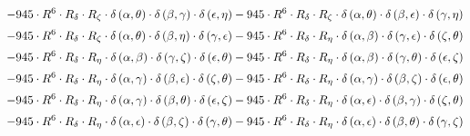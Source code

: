 \begin{subequations}
\begin{gather}
 \\[0.2em] \notag 		 - 945 \cdot R^{6} \cdot R_{\delta{}} \cdot R_{\zeta{}} \cdot \delta{}\left(\alpha{}, \theta{}\right) \cdot \delta{}\left(\beta{}, \gamma{}\right) \cdot \delta{}\left(\epsilon{}, \eta{}\right)- 945 \cdot R^{6} \cdot R_{\delta{}} \cdot R_{\zeta{}} \cdot \delta{}\left(\alpha{}, \theta{}\right) \cdot \delta{}\left(\beta{}, \epsilon{}\right) \cdot \delta{}\left(\gamma{}, \eta{}\right) 
 \\[0.2em] \notag 		 - 945 \cdot R^{6} \cdot R_{\delta{}} \cdot R_{\zeta{}} \cdot \delta{}\left(\alpha{}, \theta{}\right) \cdot \delta{}\left(\beta{}, \eta{}\right) \cdot \delta{}\left(\gamma{}, \epsilon{}\right)- 945 \cdot R^{6} \cdot R_{\delta{}} \cdot R_{\eta{}} \cdot \delta{}\left(\alpha{}, \beta{}\right) \cdot \delta{}\left(\gamma{}, \epsilon{}\right) \cdot \delta{}\left(\zeta{}, \theta{}\right) 
 \\[0.2em] \notag 		 - 945 \cdot R^{6} \cdot R_{\delta{}} \cdot R_{\eta{}} \cdot \delta{}\left(\alpha{}, \beta{}\right) \cdot \delta{}\left(\gamma{}, \zeta{}\right) \cdot \delta{}\left(\epsilon{}, \theta{}\right)- 945 \cdot R^{6} \cdot R_{\delta{}} \cdot R_{\eta{}} \cdot \delta{}\left(\alpha{}, \beta{}\right) \cdot \delta{}\left(\gamma{}, \theta{}\right) \cdot \delta{}\left(\epsilon{}, \zeta{}\right) 
 \\[0.2em] \notag 		 - 945 \cdot R^{6} \cdot R_{\delta{}} \cdot R_{\eta{}} \cdot \delta{}\left(\alpha{}, \gamma{}\right) \cdot \delta{}\left(\beta{}, \epsilon{}\right) \cdot \delta{}\left(\zeta{}, \theta{}\right)- 945 \cdot R^{6} \cdot R_{\delta{}} \cdot R_{\eta{}} \cdot \delta{}\left(\alpha{}, \gamma{}\right) \cdot \delta{}\left(\beta{}, \zeta{}\right) \cdot \delta{}\left(\epsilon{}, \theta{}\right) 
 \\[0.2em] \notag 		 - 945 \cdot R^{6} \cdot R_{\delta{}} \cdot R_{\eta{}} \cdot \delta{}\left(\alpha{}, \gamma{}\right) \cdot \delta{}\left(\beta{}, \theta{}\right) \cdot \delta{}\left(\epsilon{}, \zeta{}\right)- 945 \cdot R^{6} \cdot R_{\delta{}} \cdot R_{\eta{}} \cdot \delta{}\left(\alpha{}, \epsilon{}\right) \cdot \delta{}\left(\beta{}, \gamma{}\right) \cdot \delta{}\left(\zeta{}, \theta{}\right) 
 \\[0.2em] \notag 		 - 945 \cdot R^{6} \cdot R_{\delta{}} \cdot R_{\eta{}} \cdot \delta{}\left(\alpha{}, \epsilon{}\right) \cdot \delta{}\left(\beta{}, \zeta{}\right) \cdot \delta{}\left(\gamma{}, \theta{}\right)- 945 \cdot R^{6} \cdot R_{\delta{}} \cdot R_{\eta{}} \cdot \delta{}\left(\alpha{}, \epsilon{}\right) \cdot \delta{}\left(\beta{}, \theta{}\right) \cdot \delta{}\left(\gamma{}, \zeta{}\right) 

\end{gather}
\end{subequations}
